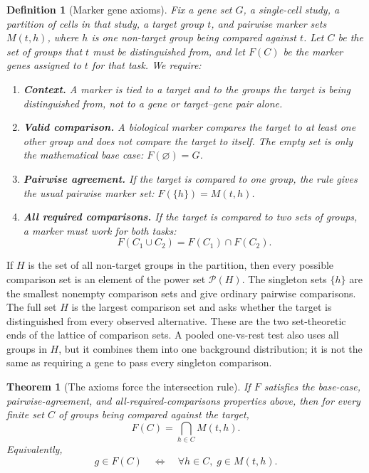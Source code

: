 \documentclass{article}
\newtheorem{definition}{Definition}
\newtheorem{theorem}{Theorem}
\begin{document}
\begin{definition}[Marker gene axioms]\label{def:marker-family-axioms}
\normalfont
Fix a gene set $G$, a single-cell study, a partition of cells in that study, a target group $t$, and pairwise marker sets $M(t,h)$, where $h$ is one non-target group being compared against $t$. Let $C$ be the set of groups that $t$ must be distinguished from, and let $F(C)$ be the marker genes assigned to $t$ for that task. We require:
\begin{enumerate}
  \item \textbf{Context.} A marker is tied to a target and to the groups the target is being distinguished from, not to a gene or target--gene pair alone.
  \item \textbf{Valid comparison.} A biological marker compares the target to at least one other group and does not compare the target to itself. The empty set is only the mathematical base case: $F(\varnothing)=G$.
  \item \textbf{Pairwise agreement.} If the target is compared to one group, the rule gives the usual pairwise marker set: $F(\{h\})=M(t,h)$.
  \item \textbf{All required comparisons.} If the target is compared to two sets of groups, a marker must work for both tasks:
\[
  F(C_1\cup C_2)=F(C_1)\cap F(C_2).
\]
\end{enumerate}
\end{definition}

If $H$ is the set of all non-target groups in the partition, then every possible comparison set is an element of the power set $\mathcal{P}(H)$. The singleton sets $\{h\}$ are the smallest nonempty comparison sets and give ordinary pairwise comparisons. The full set $H$ is the largest comparison set and asks whether the target is distinguished from every observed alternative. These are the two set-theoretic ends of the lattice of comparison sets. A pooled one-vs-rest test also uses all groups in $H$, but it combines them into one background distribution; it is not the same as requiring a gene to pass every singleton comparison.

\begin{theorem}[The axioms force the intersection rule]\label{thm:marker-axiom-representation}
If $F$ satisfies the base-case, pairwise-agreement, and all-required-comparisons properties above, then for every finite set $C$ of groups being compared against the target,
\[
  F(C)=\bigcap_{h\in C}M(t,h).
\]
Equivalently,
\[
  g\in F(C)
  \quad\Longleftrightarrow\quad
  \forall h\in C,\; g\in M(t,h).
\]
\end{theorem}
\end{document}
